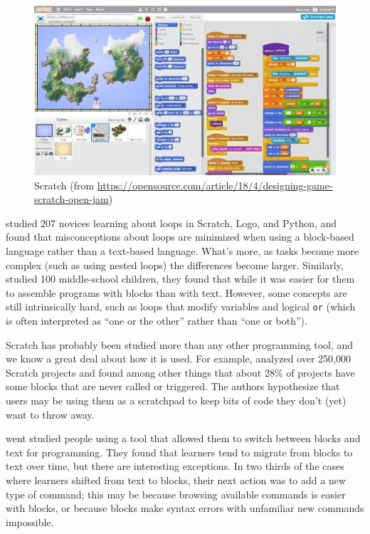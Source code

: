 \begin{figure}
\centering
\includegraphics{../docs/fig/scratch.jpg}
\caption{Scratch (from \url{https://opensource.com/article/18/4/designing-game-scratch-open-jam})}
\label{f:pck-scratch}
\end{figure}

\cite{Mlad2017} studied 207 novices learning about loops in Scratch,
Logo, and Python, and found that misconceptions about loops are
minimized when using a block-based language rather than a text-based
language.  What's more, as tasks become more complex (such as using
nested loops) the differences become larger.  Similarly,
\cite{Grov2017} studied 100 middle-school children, they found that
while it was easier for them to assemble programs with blocks than
with text.  However, some concepts are still intrinsically hard, such
as loops that modify variables and logical \texttt{or} (which is often
interpreted as ``one or the other'' rather than ``one or both'').

Scratch has probably been studied more than any other programming
tool, and we know a great deal about how it is used.  For example,
\cite{Aiva2016} analyzed over 250,000 Scratch projects and found among
other things that about 28\% of projects have some blocks that are
never called or triggered.  The authors hypothesize that users may be
using them as a scratchpad to keep bits of code they don't (yet) want
to throw away.

\cite{Wein2017a} went studied people using a tool that allowed them to
switch between blocks and text for programming.  They found that
learners tend to migrate from blocks to text over time, but there are
interesting exceptions.  In two thirds of the cases where learners
shifted from text to blocks, their next action was to add a new type
of command; this may be because browsing available commands is easier
with blocks, or because blocks make syntax errors with unfamiliar new
commands impossible.

